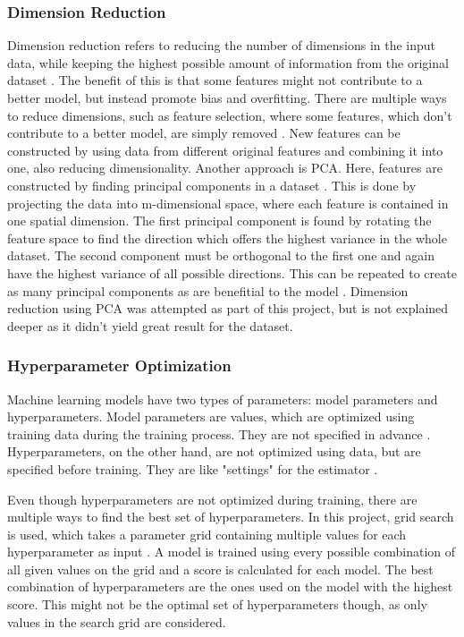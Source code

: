 \subsubsection{Dimension Reduction}
\label{sec:Dimension Reduction}

Dimension reduction refers to reducing the number of dimensions
in the input data, while keeping the highest possible amount of information from
the original dataset \cite[53]{Subasi2020}. The benefit of this is that some features might not contribute to a better model,
but instead promote bias and overfitting.
There are multiple ways to reduce dimensions, such as feature selection, where some features, which don't
contribute to a better model, are simply removed \cite[55]{Subasi2020}.
New features can be constructed by using data from different original features and
combining it into one, also reducing dimensionality.
Another approach is \ac{PCA}. Here, features are constructed by finding
principal components in a dataset \cite[p. 62f]{Subasi2020}. This is done by projecting the data into m-dimensional space,
where each feature is contained in one spatial dimension.
The first principal component is found by rotating the feature space to find the direction
which offers the highest variance in the whole dataset.
The second component must be orthogonal to the first one and again have the highest variance
of all possible directions. This can be repeated to create as many principal components as are benefitial to the model \cite[p. 62f]{Subasi2020}.
Dimension reduction using \ac{PCA} was attempted as part of this project,
but is not explained deeper as it didn't yield great result for the dataset.

\subsubsection{Hyperparameter Optimization}

Machine learning models have two types of parameters: model parameters and hyperparameters.
Model parameters are values, which are optimized using training data during the training process.
They are not specified in advance \cite[21]{Raschka2018}.
Hyperparameters, on the other hand, are not optimized using data, but are specified before training.
They are like "settings" for the estimator \cite{scikit-hyperparameters}.

Even though hyperparameters are not optimized during training,
there are multiple ways to find the best set of hyperparameters.
In this project, grid search is used, which takes a parameter grid containing
multiple values for each hyperparameter as input \cite{scikit-hyperparameters}.
A model is trained using every possible combination of all given values on the grid and a score
is calculated for each model. The best combination of hyperparameters are the ones used on the model
with the highest score. This might not be the optimal set of hyperparameters though, as only values
in the search grid are considered.

